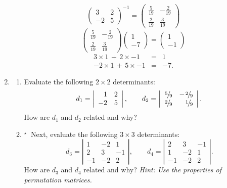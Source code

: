 \documentclass[11pt,a4paper]{article}
\def\ffrac#1#2{\leavevmode\kern.1em
\raise.5ex\hbox{\the\scriptfont0 #1}\kern-.1em
/\kern-.15em\lower.25ex\hbox{\the\scriptfont0 #2}}
\def\tough{$\!\!\!{}^\star\>$}
\begin{document}
\begin{enumerate}
{\[ \left(
\begin{array}{rr}
 3 & 2 \\
 -2 & 5
\end{array}
\right)^{-1}= \left(
\begin{array}{rr}
 \frac{5}{19} & -\frac{2}{19}
   \\
 \frac{2}{19} & \frac{3}{19}
\end{array}
\right)\]
\[  \left(
\begin{array}{rr}
 \frac{5}{19} & -\frac{2}{19}
   \\
 \frac{2}{19} & \frac{3}{19}
\end{array}
\right) 
\left(
\begin{array}{r}
1 \\ -7
\end{array}
\right) = 
\left(
\begin{array}{r}
1 \\ -1
\end{array}
\right) 
\]
\begin{eqnarray*}
3\times 1\,+\,2\times -1&=&1\\ 
-2\times 1 \,+\,5\times -1 &=&-7.
\end{eqnarray*}

\noindent\hrulefill
}{}%

\item\label{qdjsp2}
\begin{enumerate}
\item
Evaluate the following  $2\times 2$  determinants:
 $$ d_1= \left| \begin{array}{rr} 1&2 \\ -2 & 5 \end{array} \right| , \qquad
	d_2=  \left| \begin{array}{rr}  \ffrac{5}{9} &- \ffrac{2}{9}  \\  \ffrac{2}{9}  &  \ffrac{1}{9} \end{array} \right|. $$ 
How are  $d_1$ and $d_2$ related and why?
\item\tough
Next, evaluate the following  $3\times 3$ determinants:
 $$  d_3 = \left| \begin{array}{rrr} 1&-2&1 \\ 2 & 3 & -1\\-1&-2&2 \end{array} \right|, \qquad
	d_4=  \left| \begin{array}{rrr}2 & 3 & -1\\  1&-2&1 \\ -1&-2&2 \end{array} \right|. $$ 
How are  $d_3$ and $d_4$  related and why? \emph{Hint:  Use the properties of permutation matrices.}
\end{enumerate}
\end{enumerate}
\end{document}
